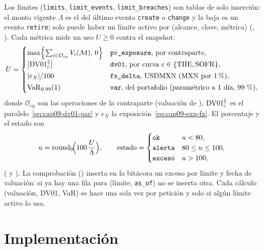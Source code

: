 Los límites (\texttt{limits}, \texttt{limit\_events}, \texttt{limit\_breaches}) son tablas de solo inserción: el monto vigente $\Lambda$ es el del último evento \texttt{create} o \texttt{change} y la baja es un evento \texttt{retire}; solo puede haber un límite activo por (alcance, clave, métrica) (, ). Cada métrica mide un uso $U\ge0$ contra el snapshot:
\begin{equation}\label{eq:cap09-uso}
  U=\begin{cases}
    \max\Bigl\{\sum_{i\in\mathcal O_{\mathrm{cp}}}\PV_i(\mathcal M),\,0\Bigr\} & \text{\texttt{pv\_exposure}, por contraparte},\\[2pt]
    \bigl|\DVO^{\parallel}_c\bigr| & \text{\texttt{dv01}, por curva }c\in\{\cTIIE,\cSOFR\},\\[2pt]
    |e_X|/100 & \text{\texttt{fx\_delta}, USDMXN (\MXN{} por $1\,\%$)},\\[2pt]
    \VaR{0.99}(1) & \text{\texttt{var}, del portafolio (paramétrico a 1 día, $99~\%$)},
  \end{cases}
\end{equation}
donde $\mathcal O_{\mathrm{cp}}$ son las operaciones de la contraparte (valuación de ), $\mathrm{DV01}^{\parallel}_c$ es el paralelo~\eqref{eq:cap09-dv01-par} y $e_X$ la exposición~\eqref{eq:cap09-exp-fx}. El porcentaje y el estado son
\begin{equation}\label{eq:cap09-pct}
  u=\mathrm{round}_{9}\!\Bigl(100\,\frac{U}{\Lambda}\Bigr),\qquad
  \text{estado}=\begin{cases}
    \texttt{ok} & u<80,\\
    \texttt{alerta} & 80\le u\le100,\\
    \texttt{exceso} & u>100,
  \end{cases}
\end{equation}
( y ). La comprobación () inserta en la bitácora un exceso por límite y fecha de valuación: si ya hay una fila para (límite, \texttt{as\_of}) no se inserta otra. Cada cálculo (valuación, DV01, VaR) se hace una sola vez por petición y solo si algún límite activo lo usa.

\section{Implementación}\label{sec:cap09-implementacion}

